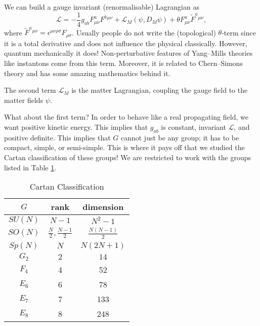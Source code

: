 
We can build a gauge invariant (renormalisable) Lagrangian as
\begin{equation}
  \label{eq:lym}
  \mathscr{L} = -\frac{1}{4} g_{ab} F^{a}_{\mu\nu} F^{b}{}^{\mu\nu} + \mathscr{L}_M (\psi, D_M \psi) + \theta F^{a}_{\mu\nu} \widetilde{F}^{a}{}^{\mu\nu}, 
\end{equation}
where $\widetilde{F}^{a}{}^{\mu\nu} = \epsilon^{\mu\nu\rho\sigma} F_{\rho\sigma}$. Usually people do not write the (topological) $\theta$-term since it is a total derivative and does not influence the physical classically. However, quantum mechanically it does!
Non-perturbative features of Yang--Mills theories like instantons come from this term.
Moreover, it is related to Chern--Simons theory and has some amazing mathematics behind it.

The second term $\mathscr{L}_M$ is the matter Lagrangian, coupling the gauge field to the matter fields $\psi$.

What about the first term? In order to behave like a real propagating field, we want positive kinetic energy. This implies that $g_{ab}$ is constant, invariant $\mathscr{L}$, and positive definite.
This implies that $G$ cannot just be any group; it has to be compact, simple, or semi-simple.
This is where it pays off that we studied the Cartan classification of these groups!
We are restricted to work with the groups listed in Table \ref{tab:l13t1}.

\begin{table}[htpb]
  \centering
  \begin{tabular}{c c c}
  $G$ & rank & dimension \\
  \hline
  $SU(N)$ & $N-1$ & $N^2 - 1$ \\
  $SO(N)$ & $\frac{N}{2},  \frac{N-1}{2}$  & $\frac{N (N-1)}{2}$  \\
  $Sp(N)$ & $N$ & $N (2N + 1)$ \\
  $G_2$ & $2$ & $14$ \\
  $F_4$ & 4 & 52 \\
  $E_6$ & 6 & 78 \\
  $E_7$ & 7 & 133 \\
  $E_8$ & 8 & 248 \\
  \end{tabular}
  \caption{Cartan Classification}
  \label{tab:l13t1}
\end{table}

